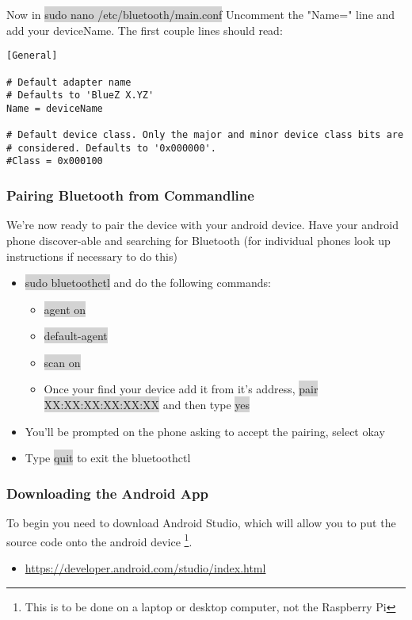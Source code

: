 \documentclass[12pt]{article}
\begin{document}
\noindent Now in \colorbox{lightgray}{sudo nano /etc/bluetooth/main.conf} Uncomment the "Name=" line and add your deviceName. The first couple lines should read:

\begin{verbatim}
[General]

# Default adapter name
# Defaults to 'BlueZ X.YZ'
Name = deviceName

# Default device class. Only the major and minor device class bits are
# considered. Defaults to '0x000000'.
#Class = 0x000100
\end{verbatim}

\subsubsection{Pairing Bluetooth from Commandline}
We're now ready to pair the device with your android device. Have your android phone discover-able and searching for Bluetooth (for individual phones look up instructions if necessary to do this)
\begin{itemize}
	\item[] \colorbox{lightgray}{sudo bluetoothctl} and do the following commands:
	\begin{itemize}
		\item[] \colorbox{lightgray}{agent on}
		\item[] \colorbox{lightgray}{default-agent}
		\item[] \colorbox{lightgray}{scan on}
		\item[] Once your find your device add it from it's address, \colorbox{lightgray}{pair XX:XX:XX:XX:XX:XX} and then type \colorbox{lightgray}{yes}
	\end{itemize}
	\item[] You'll be prompted on the phone asking to accept the pairing, select okay
	\item[] Type \colorbox{lightgray}{quit} to exit the bluetoothctl
\end{itemize}

\subsubsection{Downloading the Android App}

To begin you need to download Android Studio, which will allow you to put the source code onto the android device \footnote{This is to be done on a laptop or desktop computer, not the Raspberry Pi}.

\begin{itemize}
	\item \href{https://developer.android.com/studio/index.html}{https://developer.android.com/studio/index.html}
\end{itemize}
\end{document}
